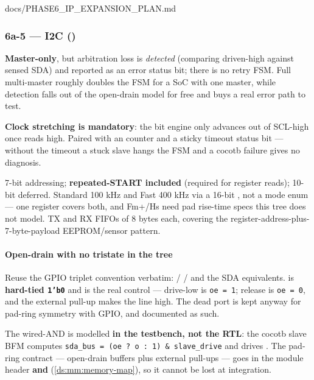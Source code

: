 \begin{relocated}{docs/PHASE6_IP_EXPANSION_PLAN.md}
\subsubsection{\texorpdfstring{6a-5 --- I2C
()}{6a-5 --- I2C ()}}\label{ds:ch:phase6-ip-expansion-plan:6a-5-i2c-rtlperiphi2c-controllersv}

\textbf{Master-only}, but arbitration loss is \emph{detected} (comparing
driven-high against sensed SDA) and reported as an error status bit;
there is no retry FSM. Full multi-master roughly doubles the FSM for a
SoC with one master, while detection falls out of the open-drain model
for free and buys a real error path to test.

\textbf{Clock stretching is mandatory}: the bit engine only advances out
of SCL-high once  reads high. Paired with an
 counter and a sticky timeout status bit --- without
the timeout a stuck slave hangs the FSM and a cocotb failure gives no
diagnosis.

7-bit addressing; \textbf{repeated-START included} (required for
register reads); 10-bit deferred. Standard 100 kHz and Fast 400 kHz via
a 16-bit , not a mode enum --- one register covers
both, and Fm+/Hs need pad rise-time specs this tree does not model. TX
and RX FIFOs of 8 bytes each, covering the
register-address-plus-7-byte-payload EEPROM/\allowbreak{}sensor pattern.

\paragraph{Open-drain with no tristate in the tree}\label{ds:ch:phase6-ip-expansion-plan:open-drain-with-no-tristate-in-the-tree}

Reuse the GPIO triplet convention verbatim:  /
 /  and the SDA equivalents.
 is \textbf{hard-tied \texttt{1'b0}} and  is the
real control --- drive-low is \texttt{oe\ =\allowbreak{}\ 1}; release is
\texttt{oe\ =\allowbreak{}\ 0}, and the external pull-up makes the line
high. The dead  port is kept anyway for pad-ring symmetry with
GPIO, and documented as such.

The wired-AND is modelled \textbf{in the testbench, not the RTL}: the
cocotb slave BFM computes
\texttt{sda\_\allowbreak{}bus\ =\allowbreak{}\ (oe\ ?\ o\ :\allowbreak{}\ 1)\ \&\ slave\_\allowbreak{}drive}
and drives . The pad-ring contract --- open-drain
buffers plus external pull-ups --- goes in the module header
\textbf{and}  (\cref{ds:mm:memory-map}), so it cannot be lost at
integration.


\end{relocated}
